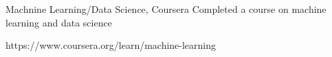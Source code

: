 

\begin{cvskills}
\cvskill
{Machnine Learning/Data Science, Coursera } %
{Completed a course on machine learning and data science } %

\cvskill
{https://www.coursera.org/learn/machine-learning} %
{ } 


\end{cvskills}
